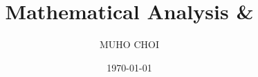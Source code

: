 \title{Mathematical Analysis  \& }
\author{MUHO CHOI}
\date{\today}
\newcommand{\bookversion}{0.1.0}
\newcommand{\bookslug}{mathematical-analysis}
\newcommand{\bookcoursecode}{MTH251 \& MTH252}
\newcommand{\bookdisplaytitle}{Mathematical Analysis \Romannum{1} \& \Romannum{2}}
